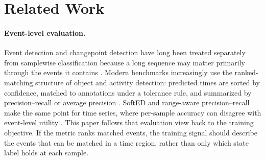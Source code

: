 \section{Related Work}
\label{sec:related-work}

\paragraph{Event-level evaluation.}
Event detection and changepoint detection have long been treated separately from samplewise classification because a long sequence may matter primarily through the events it contains \citep{guralnik1999,aminikhanghahi2017}.
Modern benchmarks increasingly use the ranked-matching structure of object and activity detection: predicted times are sorted by confidence, matched to annotations under a tolerance rule, and summarized by precision--recall or average precision \citep{everingham2010pascal,lin2014coco}.
SoftED and range-aware precision--recall make the same point for time series, where per-sample accuracy can disagree with event-level utility \citep{salles2023,tatbul2018precision}.
This paper follows that evaluation view back to the training objective.
If the metric ranks matched events, the training signal should describe the events that can be matched in a time region, rather than only which state label holds at each sample.

